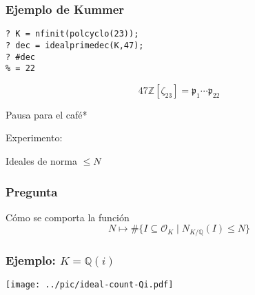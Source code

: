 \documentclass{beamer}
\newcommand{\ZZ}{\mathbb{Z}}
\newcommand{\QQ}{\mathbb{Q}}
\renewcommand{\O}{\mathcal{O}}
\begin{document}

\begin{frame}[fragile]
  \frametitle{Ejemplo de Kummer}

  \begin{shaded}\footnotesize
\begin{verbatim}
? K = nfinit(polcyclo(23));
? dec = idealprimedec(K,47);
? #dec
% = 22
\end{verbatim}
  \end{shaded}

  \[ 47 \ZZ [\zeta_{23}] = \mathfrak{p}_1\cdots \mathfrak{p}_{22} \]
\end{frame}


\begin{frame}[plain]
  \headingfont

  \begin{center}
    {\huge *Pausa para el café*

    }
  \end{center}
\end{frame}


\begin{frame}[plain]
  \headingfont

  \begin{center}
    {\huge Experimento:

      Ideales de norma $\le N$

    }
  \end{center}
\end{frame}


\begin{frame}[fragile]
  \frametitle{Pregunta}

  Cómo se comporta la función
  $$N \mapsto \# \{ I \subseteq \O_K \mid N_{K/\QQ} (I) \le N \}$$
\end{frame}


\begin{frame}[fragile]
  \frametitle{Ejemplo: $K = \QQ (i)$}

  \begin{center}
    \texttt{[image: ../pic/ideal-count-Qi.pdf]}
  \end{center}
\end{frame}
\end{document}
